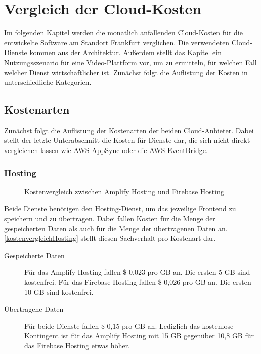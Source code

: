 \chapter{Vergleich der Cloud-Kosten}

Im folgenden Kapitel werden die monatlich anfallenden Cloud-Kosten \autocite{awsPricing} \autocite{gcpPricing} für die entwickelte Software am Standort Frankfurt verglichen. Die verwendeten Cloud-Dienste kommen aus der Architektur. Außerdem stellt das Kapitel ein Nutzungsszenario für eine Video-Plattform vor, um zu ermitteln, für welchen Fall welcher Dienst wirtschaftlicher ist. Zunächst folgt die Auflistung der Kosten in unterschiedliche Kategorien.

\section{Kostenarten}

Zunächst folgt die Auflistung der Kostenarten der beiden Cloud-Anbieter. Dabei stellt der letzte Unterabschnitt die Kosten für Dienste dar, die sich nicht direkt vergleichen lassen wie \ac{AWS} AppSync oder die \ac{AWS} EventBridge.

\subsection{Hosting}

\begin{figure}%
    \centering
    \qquad
    \caption{Kostenvergleich zwischen Amplify Hosting und Firebase Hosting}%
    \label{kostenvergleichHosting}%
\end{figure}

Beide Dienste benötigen den Hosting-Dienst, um das jeweilige Frontend zu speichern und zu übertragen. Dabei fallen Kosten für die Menge der gespeicherten Daten als auch für die Menge der übertragenen Daten an. \autoref{kostenvergleichHosting} stellt diesen Sachverhalt pro Kostenart dar.

\begin{description}
  \item[Gespeicherte Daten] Für das Amplify Hosting fallen \$ 0,023 pro GB an. Die ersten 5 GB sind kostenfrei. Für das Firebase Hosting fallen \$ 0,026 pro GB an. Die ersten 10 GB sind kostenfrei.
  \item[Übertragene Daten] Für beide Dienste fallen \$ 0,15 pro GB an. Lediglich das kostenlose Kontingent ist für das Amplify Hosting mit 15 GB gegenüber 10,8 GB für das Firebase Hosting etwas höher.
\end{description}

